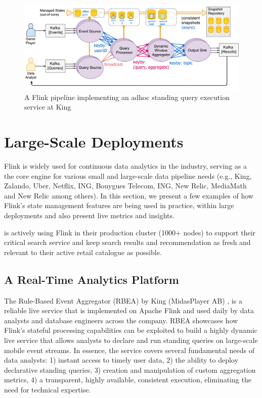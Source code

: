 \begin{figure}[t]
\centering
\includegraphics[width=\textwidth]{figures/rbea.pdf}
\caption{A Flink pipeline implementing an adhoc standing query execution service at King} 
\label{fig:rbea}
\vspace{-4mm}
\end{figure}



\section{Large-Scale Deployments}
\label{sec:evaluation}


Flink is widely used for continuous data analytics in the industry, serving as a the core engine for various small and large-scale data pipeline needs (e.g., King, Zalando, Uber, Netflix, ING, Bouygues Telecom, ING, New Relic, MediaMath and New Relic among others). In this section, we present a few examples of how Flink's state management features are being used in practice, within large deployments and also present live metrics and insights.


 is actively using Flink in their production cluster (1000+ nodes) to support their critical search service \cite{CUSTOM:web/alibaba} and keep search results and recommendation as fresh and relevant to their active retail catalogue as possible.



\subsection{A Real-Time Analytics Platform}

The Rule-Based Event Aggregator (RBEA) by King (MidasPlayer AB) \cite{CUSTOM:web/kingrbea}, is a reliable live service that is implemented on Apache Flink and used daily by data analysts and database engineers across the company. RBEA showcases how Flink's stateful processing capabilities can be exploited to build a highly dynamic live service that allows analysts to declare and run standing queries on large-scale mobile event streams. In essence, the service covers several fundamental needs of data analysts: 1) instant access to timely user data, 2) the ability to deploy declarative standing queries, 3) creation and manipulation of custom aggregation metrics, 4) a transparent, highly available, consistent execution, eliminating the need for technical expertise.

